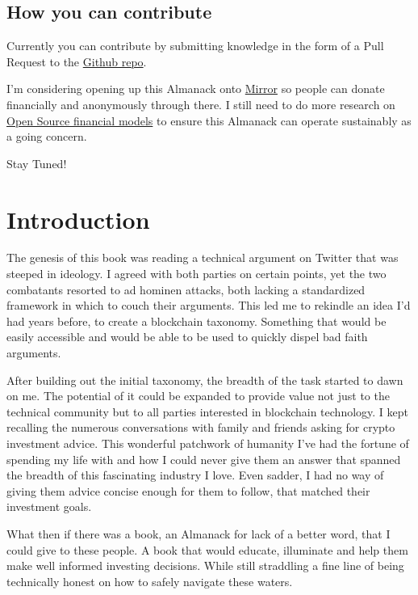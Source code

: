 \documentclass[
  letterpaper,
  DIV=11,
  numbers=noendperiod]{scrreprt}
\begin{document}
\section*{How you can contribute}\label{how-you-can-contribute}


Currently you can contribute by submitting knowledge in the form of a
Pull Request to the
\href{https://github.com/HariSeldon23/degen-almanack}{Github repo}.

I'm considering opening up this Almanack onto
\href{https://mirror.xyz/}{Mirror} so people can donate financially and
anonymously through there. I still need to do more research on
\href{http://www.catb.org/~esr/writings/magic-cauldron/}{Open Source
financial models} to ensure this Almanack can operate sustainably as a
going concern.

Stay Tuned!


\chapter{Introduction}\label{introduction}

The genesis of this book was reading a technical argument on Twitter
that was steeped in ideology. I agreed with both parties on certain
points, yet the two combatants resorted to ad hominen attacks, both
lacking a standardized framework in which to couch their arguments. This
led me to rekindle an idea I'd had years before, to create a blockchain
taxonomy. Something that would be easily accessible and would be able to
be used to quickly dispel bad faith arguments.

After building out the initial taxonomy, the breadth of the task started
to dawn on me. The potential of it could be expanded to provide value
not just to the technical community but to all parties interested in
blockchain technology. I kept recalling the numerous conversations with
family and friends asking for crypto investment advice. This wonderful
patchwork of humanity I've had the fortune of spending my life with and
how I could never give them an answer that spanned the breadth of this
fascinating industry I love. Even sadder, I had no way of giving them
advice concise enough for them to follow, that matched their investment
goals.

What then if there was a book, an Almanack for lack of a better word,
that I could give to these people. A book that would educate, illuminate
and help them make well informed investing decisions. While still
straddling a fine line of being technically honest on how to safely
navigate these waters.
\end{document}
